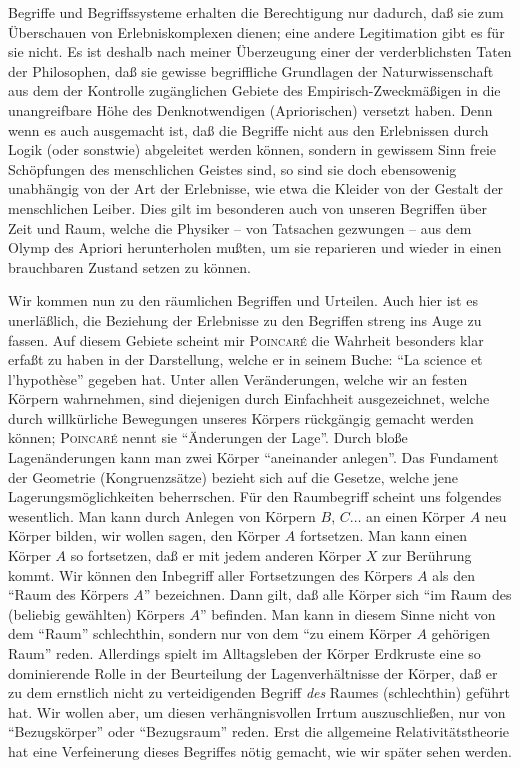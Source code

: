 Begriffe und Begriffssysteme erhalten die Berechtigung nur dadurch, daß sie zum 
Überschauen von Erlebniskomplexen dienen; eine andere Legitimation gibt es für 
sie nicht. Es ist deshalb nach meiner Überzeugung einer der verderblichsten 
Taten der Philosophen, daß sie gewisse begriffliche Grundlagen der 
Naturwissenschaft aus dem der Kontrolle zugänglichen Gebiete des 
Empirisch-Zweckmäßigen in die unangreifbare Höhe des Denknotwendigen 
(Apriorischen) versetzt haben. Denn wenn es auch ausgemacht ist, daß die 
Begriffe nicht aus den Erlebnissen durch Logik (oder sonstwie) abgeleitet werden 
können, sondern in gewissem Sinn freie Schöpfungen des menschlichen Geistes 
sind, so sind sie doch ebensowenig unabhängig von der Art der Erlebnisse, wie 
etwa die Kleider von der Gestalt der menschlichen Leiber. Dies gilt im 
besonderen auch von unseren Begriffen über Zeit und Raum, welche die Physiker -- 
von Tatsachen gezwungen -- aus dem Olymp des Apriori herunterholen mußten, um 
sie reparieren und wieder in einen brauchbaren Zustand setzen zu können.

Wir kommen nun zu den räumlichen Begriffen und Urteilen. Auch hier ist es 
unerläßlich, die Beziehung der Erlebnisse zu den Begriffen streng ins Auge zu 
fassen. Auf diesem Gebiete scheint mir 
\textsc{Poincar\'e} die Wahrheit besonders klar 
erfaßt zu haben in der Darstellung, welche er in seinem Buche: \enquote{La 
science et l'hypothèse} gegeben hat. Unter allen Veränderungen, welche wir an 
festen Körpern wahrnehmen, sind diejenigen durch Einfachheit ausgezeichnet, 
welche durch willkürliche Bewegungen unseres Körpers rückgängig gemacht werden 
können; \textsc{Poincar\'e} nennt sie 
\enquote{Änderungen der Lage}. Durch bloße Lagenänderungen kann man zwei Körper 
\enquote{aneinander anlegen}. Das Fundament der Geometrie (Kongruenzsätze) 
bezieht sich auf die Gesetze, welche jene Lagerungsmöglichkeiten beherrschen. 
Für den Raumbegriff scheint uns folgendes wesentlich. Man kann durch Anlegen von 
Körpern $B$, $C \ldots$ an einen Körper $A$ neu Körper bilden, wir wollen sagen, 
den Körper $A$ fortsetzen. Man kann einen Körper $A$ so fortsetzen, daß er mit 
jedem anderen Körper $X$ zur Berührung kommt. Wir können den Inbegriff aller 
Fortsetzungen des Körpers $A$ als den \enquote{Raum des Körpers $A$} bezeichnen. 
Dann gilt, daß alle Körper sich \enquote{im Raum des (beliebig gewählten) 
Körpers $A$} befinden. Man kann in diesem Sinne nicht von dem \enquote{Raum} 
schlechthin, sondern nur von dem \enquote{zu einem Körper $A$ gehörigen Raum} 
reden. Allerdings spielt im Alltagsleben der Körper Erdkruste eine so 
dominierende Rolle in der Beurteilung der Lagenverhältnisse der Körper, daß er 
zu dem ernstlich nicht zu verteidigenden Begriff \emph{des} Raumes (schlechthin) 
geführt hat. Wir wollen aber, um diesen verhängnisvollen Irrtum auszuschließen, 
nur von \enquote{Bezugskörper} oder \enquote{Bezugsraum} reden. Erst die 
allgemeine Relativitätstheorie hat eine Verfeinerung dieses Begriffes nötig 
gemacht, wie wir später sehen werden.

